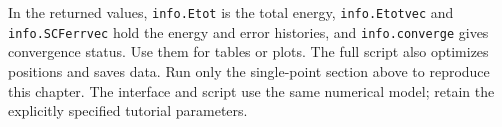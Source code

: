 In the returned values, \texttt{info.Etot} is the total energy, \texttt{info.Etotvec} and \texttt{info.SCFerrvec} hold the energy and error histories, and \texttt{info.converge} gives convergence status. Use them for tables or plots. The full script also optimizes positions and saves data. Run only the single-point section above to reproduce this chapter. The interface and script use the same numerical model; retain the explicitly specified tutorial parameters.
